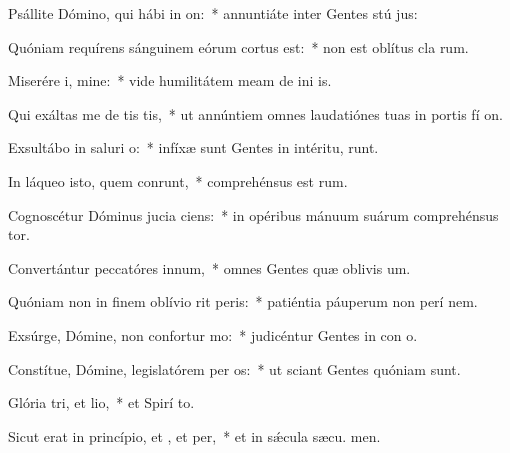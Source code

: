 \item Psállite Dómino, qui hábi in on:~* annuntiáte inter Gentes stú jus:
\item Quóniam requírens sánguinem eórum cortus est:~* non est oblítus cla rum.
\item Miserére i, mine:~* vide humilitátem meam de ini is.
\item Qui exáltas me de tis tis,~* ut annúntiem omnes laudatiónes tuas in portis fí on.
\item Exsultábo in saluri o:~* infíxæ sunt Gentes in intéritu,  runt.
\item In láqueo isto, quem conrunt,~* comprehénsus est  rum.
\item Cognoscétur Dóminus jucia ciens:~* in opéribus mánuum suárum comprehénsus  tor.
\item Convertántur peccatóres  innum,~* omnes Gentes quæ oblivis um.
\item Quóniam non in finem oblívio rit peris:~* patiéntia páuperum non perí  nem.
\item Exsúrge, Dómine, non confortur mo:~* judicéntur Gentes in con o.
\item Constítue, Dómine, legislatórem per os:~* ut sciant Gentes quóniam  sunt.
\item Glória tri, et lio,~* et Spirí to.
\item Sicut erat in princípio, et , et per,~* et in sǽcula sæcu. men.
